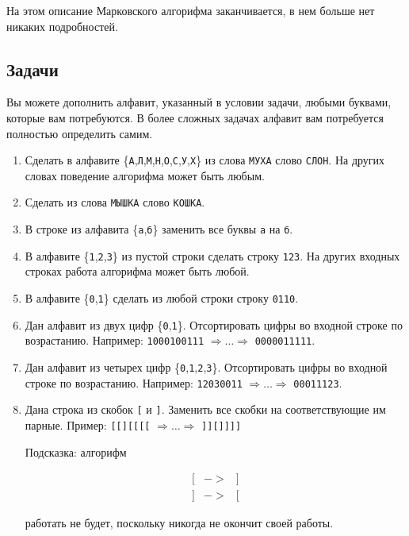 \documentclass[12pt,a4paper,oneside]{article}
\newcommand{\s}[1]{\texttt{#1}}
\begin{document}
На этом описание Марковского алгорифма заканчивается, в нем больше нет
никаких подробностей. 

\subsection{Задачи}

Вы можете дополнить алфавит, указанный в условии задачи, любыми буквами, 
которые вам потребуются. В более сложных задачах алфавит вам потребуется 
полностью определить самим. 

\begin{enumerate}
\item Сделать в алфавите 
\{\s{А},\s{Л},\s{М},\s{Н},\s
{О},\s{С},\s{У},\s{Х}\} из слова \s{МУХА} слово \s{СЛОН}.
На других словах поведение алгорифма может быть любым.

\item Сделать из слова \s{МЫШКА} слово \s{КОШКА}.

\item В строке из алфавита \{\s{а},\s{б}\} заменить все буквы \s{а} на \s{б}.

\item В алфавите \{\s{1},\s{2},\s{3}\} из пустой строки сделать 
строку \s{123}. На других
входных строках работа алгорифма может быть любой.

\item В алфавите \{\s{0},\s{1}\} сделать из любой строки строку 
\s{0110}.

\item Дан алфавит из двух цифр \{\s{0},\s{1}\}. Отсортировать 
цифры во входной строке по возрастанию. Например: \s{1000100111} 
$\Rightarrow\dots\Rightarrow$ \s{0000011111}.

\item Дан алфавит из четырех цифр \{\s{0},\s{1},\s{2},\s{3}\}. 
Отсортировать цифры во входной строке по возрастанию. Например: 
\s{12030011} $\Rightarrow\dots\Rightarrow$ \s{00011123}.

\item Дана строка из скобок \s{[} и \s{]}. Заменить все скобки на соответствующие
им парные. Пример: \s{[[][[[[} $\Rightarrow\dots\Rightarrow$ \s{]][]]]]}

Подсказка: алгорифм
\begin{bnf}\begin{eqnarray*}
\s{[}&->&\s{]}\\
\s{]}&->&\s{[}
\end{eqnarray*}\end{bnf}работать не будет, 
поскольку никогда не окончит своей работы.


\end{enumerate}
\end{document}
